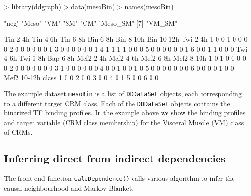 \documentclass{article}
\newcommand{\Rfun}[1]{{\texttt{#1}}}
\newcommand{\Robj}[1]{{\texttt{#1}}}
\begin{document}
\begin{Schunk}
\begin{Sinput}
> library(ddgraph)
> data(mesoBin)
> names(mesoBin)
\end{Sinput}
\begin{Soutput}
[1] "neg"     "Meso"    "VM"      "SM"      "CM"      "Meso_SM"
[7] "VM_SM"  
\end{Soutput}
\begin{Soutput}
  Tin 2-4h Tin 4-6h Tin 6-8h Bin 6-8h Bin 8-10h Bin 10-12h Twi 2-4h
1        0        0        1        0         0          0        0
2        0        0        0        0         0          0        1
3        0        0        0        0         0          0        1
4        1        1        1        1         0          0        0
5        0        0        0        0         0          0        1
6        0        0        1        1         0          0        0
  Twi 4-6h Twi 6-8h Bap 6-8h Mef2 2-4h Mef2 4-6h Mef2 6-8h Mef2 8-10h
1        0        1        0         0         0         0          0
2        0        0        0         0         0         0          0
3        1        0        0         0         0         0          0
4        0        0        1         0         0         1          0
5        0        0        0         0         0         0          0
6        0        0        0         0         1         0          0
  Mef2 10-12h class
1           0     0
2           0     0
3           0     0
4           0     1
5           0     0
6           0     0
\end{Soutput}
\end{Schunk}

The example dataset \Robj{mesoBin} is a list of \Robj{DDDataSet} objects, each corresponding to a different target CRM class. Each of the \Robj{DDDataSet} objects contains the binarized TF binding profiles. In the example above we show the binding profiles and target variable (CRM class membership) for the Visceral Muscle (VM) class of CRMs.

\subsection{Inferring direct from indirect dependencies}

The front-end function \Rfun{calcDependence()} calls various algorithm to infer the causal neighbourhood and Markov Blanket. 
\end{document}

